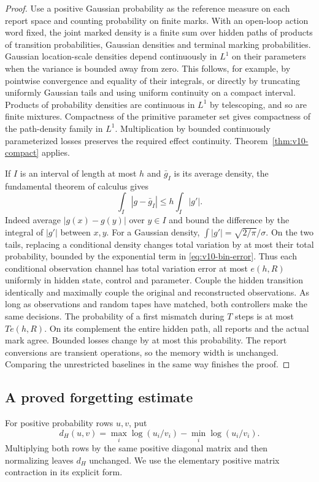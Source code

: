 \begin{proof}
Use a positive Gaussian probability as the reference measure on each
report space and counting probability on finite marks. With an
open-loop action word fixed, the joint marked density is a finite
sum over hidden paths of products of transition probabilities,
Gaussian densities and terminal marking probabilities. Gaussian
location-scale densities depend continuously in $L^1$ on their
parameters when the variance is bounded away from zero. This follows,
for example, by pointwise convergence and equality of their integrals,
or directly by truncating uniformly Gaussian tails and using uniform
continuity on a compact interval. Products of probability densities
are continuous in $L^1$ by telescoping, and so are finite mixtures.
Compactness of the primitive parameter set gives compactness of the
path-density family in $L^1$. Multiplication by bounded continuously
parameterized losses preserves the required effect continuity.
Theorem~\ref{thm:v10-compact} applies.

If $I$ is an interval of length at most $h$ and $\bar g_I$ is its
average density, the fundamental theorem of calculus gives
\[
 \int_I|g-\bar g_I|\le h\int_I|g'|.
\]
Indeed average $|g(x)-g(y)|$ over $y\in I$ and bound the difference
by the integral of $|g'|$ between $x,y$. For a Gaussian density,
$\int|g'|=\sqrt{2/\pi}/\sigma$. On the two tails, replacing a
conditional density changes total variation by at most their total
probability, bounded by the exponential term in
\eqref{eq:v10-bin-error}. Thus each conditional observation channel
has total variation error at most $e(h,R)$ uniformly in hidden state,
control and parameter. Couple the hidden transition identically and
maximally couple the original and reconstructed observations. As
long as observations and random tapes have matched, both controllers
make the same decisions. The probability of a first mismatch during
$T$ steps is at most $Te(h,R)$. On its complement the entire hidden
path, all reports and the actual mark agree. Bounded losses change
by at most this probability. The report conversions are transient
operations, so the memory width is unchanged. Comparing the
unrestricted baselines in the same way finishes the proof.
\end{proof}

\subsection{A proved forgetting estimate}
For positive probability rows $u,v$, put
\[
 d_H(u,v)=\max_i\log(u_i/v_i)-\min_i\log(u_i/v_i).
\]
Multiplying both rows by the same positive diagonal matrix and then
normalizing leaves $d_H$ unchanged. We use the elementary positive
matrix contraction in its explicit form.

